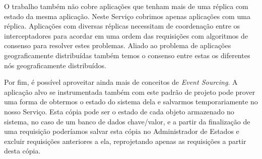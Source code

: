 O trabalho também não cobre aplicações que tenham mais de uma réplica com estado da
mesma aplicação. Neste Serviço cobrimos apenas aplicações com uma réplica.
Aplicações com diversas réplicas necessitam de coordenação entre os interceptadores
para acordar em uma ordem das requisições com algoritmos de consenso para resolver
estes problemas. Aliado ao problema de aplicações geograficamente distribuídas
também temos o consenso entre estas os diferentes nós geograficamente distribuídos.

Por fim, é possível aproveitar ainda mais de conceitos de \textit{Event Sourcing}.
A aplicação alvo se instrumentada também com este padrão de projeto pode prover uma
forma de obtermos o estado do sistema dela e salvarmos temporariamente no nosso
Serviço. Esta cópia pode ser o estado de cada objeto armazenado no sistema, no caso
de um banco de dados chave/valor, e a partir da finalização de uma requisição poderíamos
salvar esta cópia no Administrador de Estados e excluir requisições anteriores a ela,
reprojetando apenas as requisições a partir desta cópia.
